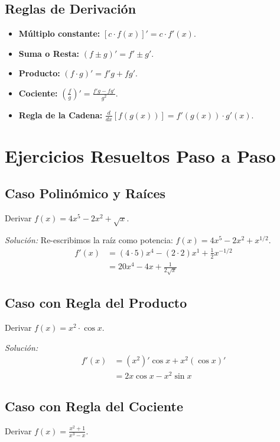 \documentclass[12pt,a4paper,openany,oneside]{book}
\begin{document}
\subsection{Reglas de Derivación}
\begin{itemize}
    \item \textbf{Múltiplo constante:} $[c \cdot f(x)]' = c \cdot f'(x)$.
    \item \textbf{Suma o Resta:} $(f \pm g)' = f' \pm g'$.
    \item \textbf{Producto:} $(f \cdot g)' = f'g + fg'$.
    \item \textbf{Cociente:} $\left( \frac{f}{g} \right)' = \frac{f'g - fg'}{g^2}$.
    \item \textbf{Regla de la Cadena:} $\frac{d}{dx}[f(g(x))] = f'(g(x)) \cdot g'(x)$.
\end{itemize}

\section{Ejercicios Resueltos Paso a Paso}

\subsection{Caso Polinómico y Raíces}
Derivar $f(x) = 4x^5 - 2x^2 + \sqrt{x}$. 

\textit{Solución:} Re-escribimos la raíz como potencia: $f(x) = 4x^5 - 2x^2 + x^{1/2}$.
\begin{align*}
f'(x) &= (4 \cdot 5)x^4 - (2 \cdot 2)x^1 + \frac{1}{2}x^{-1/2} \\
&= 20x^4 - 4x + \frac{1}{2\sqrt{x}}
\end{align*}

\subsection{Caso con Regla del Producto}
Derivar $f(x) = x^2 \cdot \cos x$. 

\textit{Solución:} 
\begin{align*}
f'(x) &= (x^2)'\cos x + x^2(\cos x)' \\
&= 2x\cos x - x^2\sin x
\end{align*}

\subsection{Caso con Regla del Cociente}
Derivar $f(x) = \frac{x^2 + 1}{x^3 - x}$.
\end{document}
